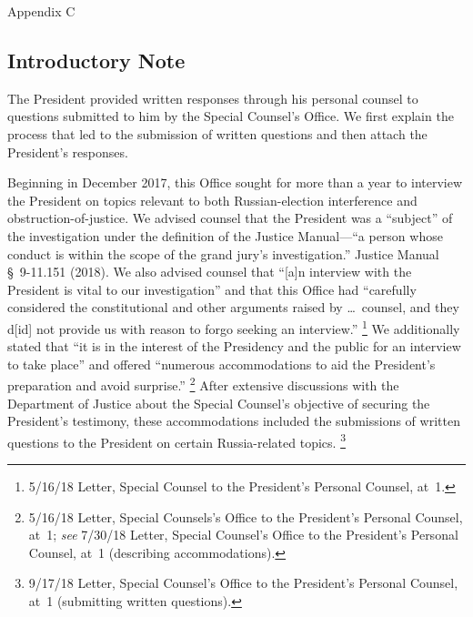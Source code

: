 
\thispagestyle{empty}

\vspace*{15em}

\begin{center}

\Huge
Appendix C

\end{center}

\newpage

\subsection{Introductory Note}

The President provided written responses through his personal counsel to questions submitted to him by the Special Counsel's Office. We first explain the process that led to the submission of written questions and then attach the President's responses.

Beginning in December 2017, this Office sought for more than a year to interview the President on topics relevant to both Russian-election interference and obstruction-of-justice.
We advised counsel that the President was a ``subject'' of the investigation under the definition of the Justice Manual---``a person whose conduct is within the scope of the grand jury's investigation.''
Justice Manual \S~9-11.151 (2018).
We also advised counsel that ``[a]n interview with the President is vital to our investigation'' and that this Office had ``carefully considered the constitutional and other arguments raised by \dots\ counsel, and they d[id] not provide us with reason to forgo seeking an interview.''%
\footnote{5/16/18 Letter, Special Counsel to the President's Personal Counsel, at~1.}
We additionally stated that ``it is in the interest of the Presidency and the public for an interview to take place'' and offered ``numerous accommodations to aid the President's preparation and avoid surprise.''%
\footnote{5/16/18 Letter, Special Counsels's Office to the President's Personal Counsel, at~1;
\textit{see} 7/30/18 Letter, Special Counsel's Office to the President's Personal Counsel, at~1 (describing accommodations).}
After extensive discussions with the Department of Justice about the Special Counsel's objective of securing the President's testimony, these accommodations included the submissions of written questions to the President on certain Russia-related topics.%
\footnote{9/17/18 Letter, Special Counsel's Office to the President's Personal Counsel, at~1 (submitting written questions).}

